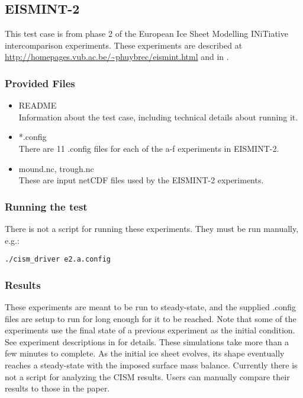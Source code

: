 \subsection{EISMINT-2}
\label{sec:eismint2_description}
This test case is from phase 2 of the European Ice Sheet Modelling INiTiative intercomparison experiments.  These experiments are described at \url{http://homepages.vub.ac.be/~phuybrec/eismint.html} and in \citet{Payne2000}.

\subsubsection{Provided Files}
\label{subsec:eismint2_files}

\begin{itemize}
	\item README \\
		Information about the test case, including technical details about running it.
  \item *.config \\
  There are 11 .config files for each of the a-f experiments in EISMINT-2.
  \item mound.nc, trough.nc \\
    These are input netCDF files used by the EISMINT-2 experiments.
\end{itemize}

\subsubsection{Running the test}
There is not a script for running these experiments.  They must be run manually, e.g.: 

\texttt{./cism\_driver e2.a.config}


\subsubsection{Results}
\label{subsecc:eismint2_results}
These experiments are meant to be run to steady-state, and the supplied .config files are setup to run for long enough for it to be reached.  
Note that some of the experiments use the final state of a previous experiment 
as the initial condition.  See experiment descriptions in \citet{Payne2000} for details.
These simulations take more than a few minutes to complete.
As the initial ice sheet evolves, its shape eventually reaches a steady-state with the imposed surface mass balance.  Currently there is not a script for analyzing the CISM results.  Users can manually compare their results to those in the \citet{Payne2000} paper.


